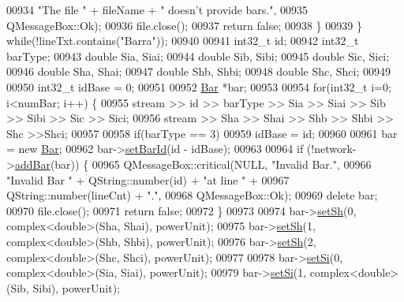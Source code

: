 \begin{DoxyCode}
00934                             \textcolor{stringliteral}{"The file "} + fileName + \textcolor{stringliteral}{" doesn't provide bars."},
00935                             QMessageBox::Ok);
00936       file.close();
00937       \textcolor{keywordflow}{return} \textcolor{keyword}{false};
00938     \}
00939   \} \textcolor{keywordflow}{while}(!lineTxt.contains(\textcolor{stringliteral}{"Barra"}));
00940 
00941   int32\_t id;
00942   int32\_t barType;
00943   \textcolor{keywordtype}{double} Sia, Siai;
00944   \textcolor{keywordtype}{double} Sib, Sibi;
00945   \textcolor{keywordtype}{double} Sic, Sici;
00946   \textcolor{keywordtype}{double} Sha, Shai;
00947   \textcolor{keywordtype}{double} Shb, Shbi;
00948   \textcolor{keywordtype}{double} Shc, Shci;
00949 
00950   int32\_t idBase = 0;
00951 
00952   \hyperlink{class_bar}{Bar} *bar;
00953 
00954   \textcolor{keywordflow}{for}(int32\_t i=0; i<numBar; i++) \{
00955     stream >> \textcolor{keywordtype}{id} >> barType >> Sia >> Siai >> Sib >> Sibi >> Sic >> Sici;
00956     stream >> Sha >> Shai >> Shb >> Shbi >> Shc >>Shci;
00957 
00958     \textcolor{keywordflow}{if}(barType == 3)
00959       idBase = id;
00960 
00961     bar = \textcolor{keyword}{new} \hyperlink{class_bar}{Bar};
00962     bar->\hyperlink{group___models_gae3cf341a76cc4589fe3203d0a3ed2ac0}{setBarId}(\textcolor{keywordtype}{id} - idBase);
00963 
00964     \textcolor{keywordflow}{if} (!network->\hyperlink{group___models_ga8c5dfef0216731246f7411e1a5fbee01}{addBar}(bar)) \{
00965       QMessageBox::critical(NULL, \textcolor{stringliteral}{"Invalid Bar."},
00966                             \textcolor{stringliteral}{"Invalid Bar "} + QString::number(\textcolor{keywordtype}{id}) + \textcolor{stringliteral}{"at line "} +
00967                             QString::number(lineCnt) + \textcolor{stringliteral}{"."},
00968                             QMessageBox::Ok);
00969       \textcolor{keyword}{delete} bar;
00970       file.close();
00971       \textcolor{keywordflow}{return} \textcolor{keyword}{false};
00972     \}
00973 
00974     bar->\hyperlink{group___models_gafd91c7f15566b9d5a68a197efeaeaf26}{setSh}(0, complex<double>(Sha, Shai), powerUnit);
00975     bar->\hyperlink{group___models_gafd91c7f15566b9d5a68a197efeaeaf26}{setSh}(1, complex<double>(Shb, Shbi), powerUnit);
00976     bar->\hyperlink{group___models_gafd91c7f15566b9d5a68a197efeaeaf26}{setSh}(2, complex<double>(Shc, Shci), powerUnit);
00977 
00978     bar->\hyperlink{group___models_ga85e2a9b8a281900333fd65d1b532acfd}{setSi}(0, complex<double>(Sia, Siai), powerUnit);
00979     bar->\hyperlink{group___models_ga85e2a9b8a281900333fd65d1b532acfd}{setSi}(1, complex<double>(Sib, Sibi), powerUnit);

\end{DoxyCode}
